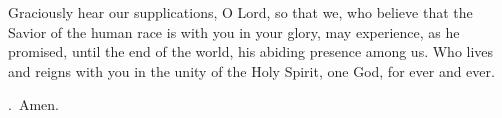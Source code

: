 \lettrine[lines=3]{G}{}raciously hear our supplications, O Lord,
so that we, who believe that the Savior of the human race
is with you in your glory,
may experience, as he promised,
until the end of the world,
his abiding presence among us.
Who lives and reigns with you in the unity of the Holy Spirit,
one God, for ever and ever.
\par \Rbar.~Amen.
